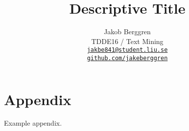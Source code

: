 \documentclass[11pt]{article}
\title{Descriptive Title}
\author{Jakob Berggren \\
  TDDE16 / Text Mining \\
  \href{mailto:jakbe841@student.liu.se}{\texttt{jakbe841@student.liu.se}} \\
  \href{https://github.com/jakeberggren}{\texttt{github.com/jakeberggren}}}
\begin{document}
\maketitle

\begin{abstract}

\end{abstract}











\appendix

\section{Appendix}
\label{sec:appendix}

Example appendix.
\end{document}
